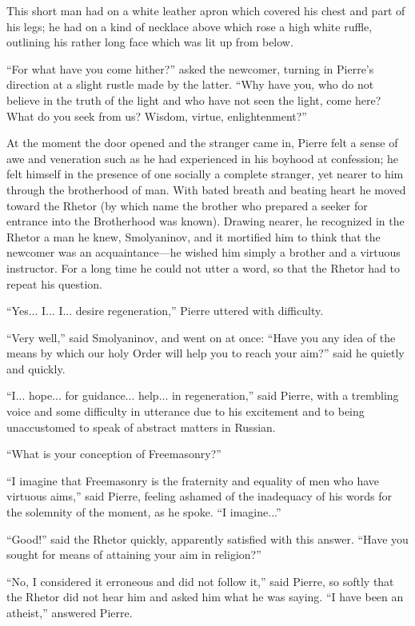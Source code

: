 This short man had on a white leather apron which covered his
chest and part of his legs; he had on a kind of necklace above
which rose a high white ruffle, outlining his rather long face
which was lit up from below.

``For what have you come hither?'' asked the newcomer, turning in
Pierre's direction at a slight rustle made by the latter. ``Why
have you, who do not believe in the truth of the light and who
have not seen the light, come here? What do you seek from us?
Wisdom, virtue, enlightenment?''

At the moment the door opened and the stranger came in, Pierre
felt a sense of awe and veneration such as he had experienced in
his boyhood at confession; he felt himself in the presence of one
socially a complete stranger, yet nearer to him through the
brotherhood of man. With bated breath and beating heart he moved
toward the Rhetor (by which name the brother who prepared a
seeker for entrance into the Brotherhood was known). Drawing
nearer, he recognized in the Rhetor a man he knew, Smolyaninov,
and it mortified him to think that the newcomer was an
acquaintance---he wished him simply a brother and a virtuous
instructor.  For a long time he could not utter a word, so that
the Rhetor had to repeat his question.

``Yes... I... I... desire regeneration,'' Pierre uttered with
difficulty.

``Very well,'' said Smolyaninov, and went on at once: ``Have you
any idea of the means by which our holy Order will help you to
reach your aim?''  said he quietly and quickly.

``I... hope... for guidance... help... in regeneration,'' said
Pierre, with a trembling voice and some difficulty in utterance
due to his excitement and to being unaccustomed to speak of
abstract matters in Russian.

``What is your conception of Freemasonry?''

``I imagine that Freemasonry is the fraternity and equality of
men who have virtuous aims,'' said Pierre, feeling ashamed of the
inadequacy of his words for the solemnity of the moment, as he
spoke. ``I imagine...''

``Good!'' said the Rhetor quickly, apparently satisfied with this
answer.  ``Have you sought for means of attaining your aim in
religion?''

``No, I considered it erroneous and did not follow it,'' said
Pierre, so softly that the Rhetor did not hear him and asked him
what he was saying. ``I have been an atheist,'' answered Pierre.

